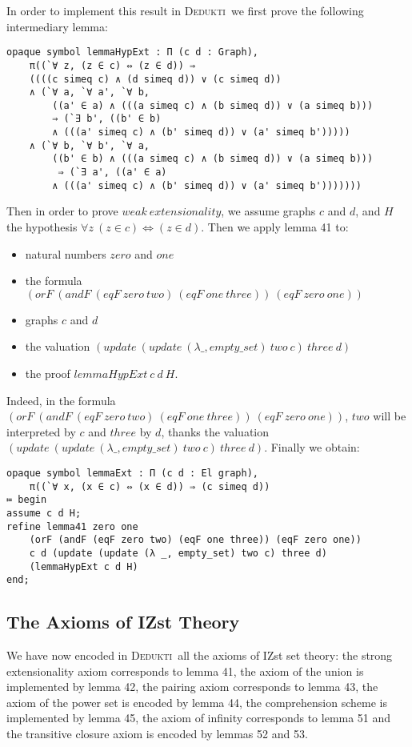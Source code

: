 \documentclass[submission,copyright,creativecommons]{eptcs}
\def\fa{{\forall}}
\newcommand{\dedukti}{\textsc{Dedukti}}
\begin{document}
In order to implement this result in \dedukti ~we first prove the following intermediary lemma:

\begin{lstlisting}
opaque symbol lemmaHypExt : Π (c d : Graph), 
	π((`∀ z, (z ∈ c) ⇔ (z ∈ d)) ⇒ 
	((((c simeq c) ∧ (d simeq d)) ∨ (c simeq d))
	∧ (`∀ a, `∀ a', `∀ b, 
		((a' ∈ a) ∧ (((a simeq c) ∧ (b simeq d)) ∨ (a simeq b))) 
		⇒ (`∃ b', ((b' ∈ b) 
		∧ (((a' simeq c) ∧ (b' simeq d)) ∨ (a' simeq b')))))
	∧ (`∀ b, `∀ b', `∀ a, 
		((b' ∈ b) ∧ (((a simeq c) ∧ (b simeq d)) ∨ (a simeq b)))
		 ⇒ (`∃ a', ((a' ∈ a) 
	 	∧ (((a' simeq c) ∧ (b' simeq d)) ∨ (a' simeq b')))))))
\end{lstlisting}

Then in order to prove $weak \ extensionality$, we assume graphs $c$ and $d$, and $H$ the hypothesis $\fa z~ (z \in c) \Leftrightarrow (z \in d)$. Then we apply lemma 41 to:

\begin{itemize}
\item natural numbers $zero$ and $one$
\item the formula $(orF~(andF~(eqF~zero~two)~(eqF~one~three))~(eqF~zero~one))$
\item graphs $c$ and $d$
\item the valuation $(update~(update~(\lambda \_, empty\_set)~two~c)~three~d)$ 
\item the proof $lemmaHypExt~c~d~H$.
\end{itemize}

Indeed, in the formula $(orF~(andF~(eqF~zero~two)~(eqF~one~three))~(eqF~zero~one))$, $two$ will be interpreted by $c$ and $three$ by $d$, thanks the valuation $(update~(update~(\lambda \_, empty\_set)~two~c)~three~d)$. Finally we obtain:


\begin{lstlisting}
opaque symbol lemmaExt : Π (c d : El graph), 
	π((`∀ x, (x ∈ c) ⇔ (x ∈ d)) ⇒ (c simeq d))
≔ begin
assume c d H;
refine lemma41 zero one 
	(orF (andF (eqF zero two) (eqF one three)) (eqF zero one)) 
	c d (update (update (λ _, empty_set) two c) three d) 
	(lemmaHypExt c d H)
end;
\end{lstlisting}

\subsection{The Axioms of IZst Theory}

We have now encoded in \dedukti ~all the axioms of IZst set theory: the strong extensionality axiom corresponds to lemma 41, the axiom of the union is implemented by lemma 42, the pairing axiom corresponds to lemma 43, the axiom of the power set is encoded by lemma 44, the comprehension scheme is implemented by lemma 45, the axiom of infinity corresponds to lemma 51 and the transitive closure axiom is encoded by lemmas 52 and 53.
\end{document}
